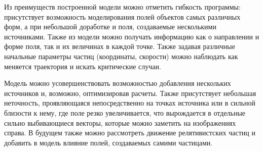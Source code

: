 \documentclass[12pt,a4paper]{article}
\begin{document}
Из преимуществ построенной модели можно отметить гибкость программы: присутствует возможность моделирования полей объектов самых различных форм, а при небольшой доработке и поля, создаваемые несколькими источниками.
Также из модели можно получать информацию как о направлении и форме поля, так и их величинах в каждой точке.
Также задавая различные начальные параметры частиц (координаты, скорости) можно наблюдать как меняется траектория и искать критические случаи.

Модель можно усовершенствовать возможностью добавления нескольких источников и, возможно, оптимизировав расчеты. 
Также присутствует небольшая неточность, проявляющаяся непосредственно на точках источника или в сильной близости к нему, где поле резко увеличивается, что вырождается в отдельные сильно выбивающиеся векторы, которые можно заметить на изображениях справа.
В будущем также можно рассмотреть движение релятивистских частиц и добавить в модель влияние полей, создаваемых самими частицами.
\end{document}
